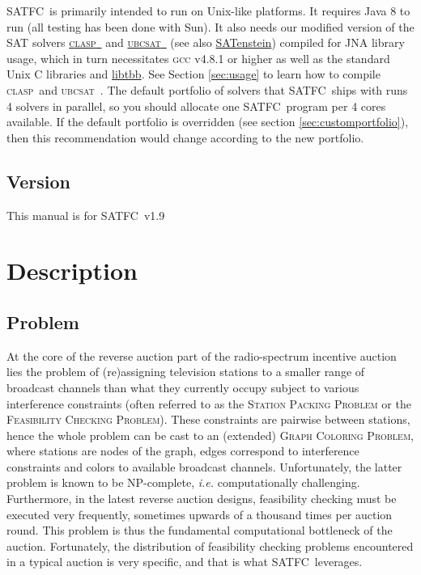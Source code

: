 \documentclass[
10pt, %
letterpaper, %
oneside, %
headinclude,footinclude, %
BCOR5mm, %
needspace, %
]{scrartcl}
\newcommand{\SATFC}{\textsc{SATFC}~}
\newcommand{\clasp}{\textsc{clasp}~}
\newcommand{\ubcsat}{\textsc{ubcsat}~}
\newcommand{\SATFCVersion}{v1.9~}
\begin{document}
\SATFC is primarily intended to run on Unix-like platforms. It requires Java 8 to run (all testing has been done with Sun). It also needs our modified version of the SAT solvers \href{http://potassco.sourceforge.net/}{\clasp} and \href{http://ubcsat.dtompkins.com/}{\ubcsat} (see also \href{http://www.cs.ubc.ca/labs/beta/Projects/SATenstein/}{SATenstein}) compiled for JNA library usage, which in turn necessitates \textsc{gcc} v4.8.1 or higher as well as the standard Unix C libraries and \href{https://www.threadingbuildingblocks.org/}{libtbb}. See Section \ref{sec:usage} to learn how to compile \clasp and \ubcsat. The default portfolio of solvers that \SATFC ships with runs 4 solvers in parallel, so you should allocate one \SATFC program per 4 cores available. If the default portfolio is overridden (see section \ref{sec:customportfolio}), then this recommendation would change according to the new portfolio.

\subsection{Version}
This manual is for \SATFC \SATFCVersion

\section{Description}

\subsection{Problem}
At the core of the reverse auction part of the radio-spectrum incentive auction lies the problem of (re)assigning television stations to a smaller range of broadcast channels than what they currently occupy subject to various interference constraints (often referred to as the \textsc{Station Packing Problem} or the \textsc{Feasibility Checking Problem}). These constraints are pairwise between stations, hence the whole problem can be cast to an (extended) \textsc{Graph Coloring Problem}, where stations are nodes of the graph, edges correspond to interference constraints and colors to available broadcast channels. Unfortunately, the latter problem is known to be {NP}-complete, \emph{i.e.} computationally challenging. Furthermore, in the latest reverse auction designs, feasibility checking must be executed very frequently, sometimes upwards of a thousand times per auction round. This problem is thus the fundamental computational bottleneck of the auction. Fortunately, the distribution of feasibility checking problems encountered in a typical auction is very specific, and that is what \SATFC leverages.
\end{document}
